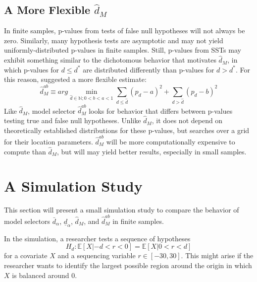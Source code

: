 \documentclass[sts]{imsart}\usepackage[]{graphicx}\usepackage[]{color}
\newcommand{\dalphaU}{\bar{d}_\alpha}
\newcommand{\dalphaB}{\underline{d}_\alpha}
\newcommand{\dstar}{d^*}
\newcommand{\dhat}{\hat{d}}
\newcommand{\dhatm}{\hat{d}_M}
\newcommand{\dhatmab}{\hat{d}^{ab}_M}
\newcommand{\EE}{\mathbb{E}}
\begin{document}
\subsection{A More Flexible $\dhatm$}
In finite samples, p-values from tests of false null hypotheses will
not always be zero.
Similarly, many hypothesis tests are asymptotic and may not yield
uniformly-distributed p-values in finite samples.
Still, p-values from SSTs may exhibit something similar to the
dichotomous behavior that motivates $\dhatm$, in which p-values for
$d\le \dstar$ are distributed differently than p-values for
$d>\dstar$.
For this reason, \citet{mallik} suggested a more flexible estimate:
\begin{equation}
  \dhatmab \equiv arg\displaystyle\min_{\dhat\in \mathbb{N}; 0<b<a<1}
  \displaystyle\sum_{d\le \dhat} ( p_d
  -a)^2+\displaystyle\sum_{d>\dhat} (p_d-b)^2
\end{equation}
Like $\dhatm$, model selector $\dhatmab$ looks for behavior that
differs between p-values testing true and false null hypotheses.
Unlike $\dhatm$, it does not depend on theoretically established
distributions for these p-values, but searches over a grid for their
location parameters.
$\dhatmab$ will be more computationally expensive to compute than
$\dhatm$, but will may yield better results, especially in small
samples.



\section{A Simulation Study}\label{sec:simulation}

This section will present a small simulation study to compare the
behavior of model selectors $\dalphaU$, $\dalphaB$,
$\dhatm$, and $\dhatmab$ in finite samples.

In the simulation, a researcher tests a sequence of hypotheses
\begin{equation}\label{eq:nullSim}
H_d: \EE [X|-d<r<0]=\EE [X|0<r<d]
\end{equation}
for a covariate $X$ and a sequencing variable $r\in [-30,30]$.
This might arise if the researcher wants to identify the largest
possible region around the origin in which $X$ is balanced around 0.
\end{document}
